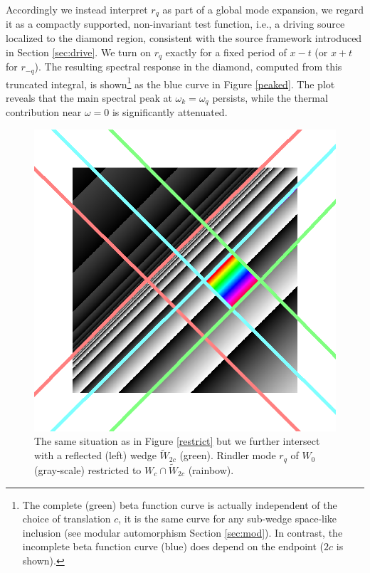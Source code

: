 \documentclass[12pt,a4paper]{article}
\begin{document}
{Accordingly we instead interpret $r_q$ as part of a global mode expansion, we regard it as a compactly supported, non-invariant test function, i.e., a driving source localized to the diamond region, consistent with the source framework introduced in Section \ref{sec:drive}. We turn on $r_q$ exactly for a fixed period of $x-t$ (or $x+t$ for $r_{-q}$). The resulting spectral response in the diamond, computed from this truncated integral, is shown\footnote{The complete (green) beta function curve is actually independent of the choice of translation $c$, it is the same curve for any sub-wedge space-like inclusion (see modular automorphism Section \ref{sec:mod}). In contrast, the incomplete beta function curve (blue) does depend on the endpoint ($2c$ is shown).} as the blue curve in Figure \ref{peaked}. The plot reveals that the main spectral peak at $\omega_k = \omega_q$ persists, while the thermal contribution near $\omega = 0$ is significantly attenuated.

\begin{figure}[h]
  \centering
\includegraphics[scale=0.4]{diamond_in_wedge.png}
\caption{The same situation as in Figure \ref{restrict} but we further intersect with a reflected (left) wedge $\widetilde{W}_{2c}$ (green). Rindler mode $r_q$ of $W_0$ (gray-scale) restricted to $W_c \cap \widetilde{W}_{2c}$ (rainbow).}
\label{diamond}
\end{figure}


}
\end{document}
